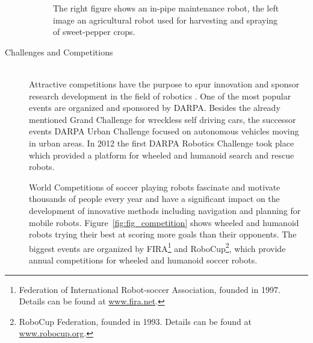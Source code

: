 \begin{description}
\begin{figure}[thpb]
	  \myfloatalign
      \footnotesize
      \centering
   \caption[Commercial robots]{The right figure shows an in-pipe maintenance robot, the left image an agricultural robot used for harvesting and spraying of sweet-pepper crops.}
   \label{fig:fig_commercial}
\end{figure}

\item[Challenges and Competitions]\hfill \\
Attractive competitions have the purpose to spur innovation and sponsor research development in the field of robotics .  
One of the most popular events are organized and sponsored by DARPA. Besides the already mentioned Grand Challenge for wreckless self driving cars, the successor events DARPA Urban Challenge focused on autonomous vehicles moving in urban areas. 
In 2012 the first DARPA Robotics Challenge took place which provided a platform for wheeled and humanoid search and rescue robots.

World Competitions of soccer playing robots fascinate and motivate thousands of people every year and have a significant impact on the development of innovative methods including navigation and planning for mobile robots.
Figure~\ref{fig:fig_competition} shows wheeled and humanoid robots trying their best at scoring more goals than their opponents.
The biggest events are organized by FIRA\footnote{Federation of International Robot-soccer Association, founded in 1997. Details can be found at \url{www.fira.net}.} and RoboCup\footnote{RoboCup Federation, founded in 1993. Details can be found at \url{www.robocup.org}.}, which provide annual competitions for wheeled and humanoid soccer robots.


\end{description}
